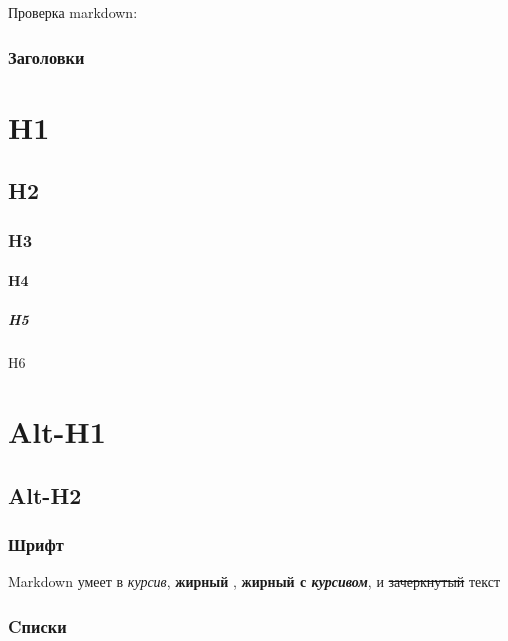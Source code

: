 Проверка markdown:

\hypertarget{ux437ux430ux433ux43eux43bux43eux432ux43aux438}{%
\subsubsection{Заголовки}\label{ux437ux430ux433ux43eux43bux43eux432ux43aux438}}

\hypertarget{h1}{%
\section{H1}\label{h1}}

\hypertarget{h2}{%
\subsection{H2}\label{h2}}

\hypertarget{h3}{%
\subsubsection{H3}\label{h3}}

\hypertarget{h4}{%
\paragraph{H4}\label{h4}}

\hypertarget{h5}{%
\subparagraph{H5}\label{h5}}

H6

\hypertarget{alt-h1}{%
\section{Alt-H1}\label{alt-h1}}

\hypertarget{alt-h2}{%
\subsection{Alt-H2}\label{alt-h2}}

\hypertarget{ux448ux440ux438ux444ux442}{%
\subsubsection{Шрифт}\label{ux448ux440ux438ux444ux442}}

Markdown умеет в \emph{курсив}, \textbf{жирный }, \textbf{жирный с
\emph{курсивом}}, и \sout{зачеркнутый} текст

\hypertarget{cux43fux438ux441ux43aux438}{%
\subsubsection{Cписки}\label{cux43fux438ux441ux43aux438}}

